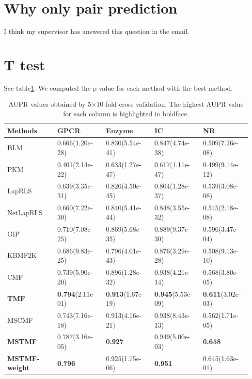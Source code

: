 \documentclass{article}
\begin{document}
\section{Why only pair prediction}
I think my supervisor has answered this question in the email. 

\section{T test}
See table\ref{results_comp_with_other_methods}.
We computed the p value for each method with the best method.

\begin{table}[htbp]
\caption{AUPR values obtained by 5$\times$10-fold cross validation. The highest AUPR value for each column is highlighted in boldface. }\label{results_comp_with_other_methods}
\centering
{}
\begin{tabular}{lllll}
\toprule
Methods & GPCR & Enzyme & IC & NR\\
\midrule
BLM & 0.666(1.20e-28) & 0.830(5.54e-41) & 0.847(4.74e-38) & 0.509(7.26e-08) \\
PKM & 0.401(2.14e-22) & 0.633(1.27e-47)  & 0.617(1.11e-47) & 0.499(9.14e-12) \\
LapRLS & 0.639(3.35e-31) & 0.826(4.50e-45) & 0.804(1.28e-37) & 0.539(3.08e-08)\\
NetLapRLS & 0.660(7.22e-30) & 0.840(5.41e-44) & 0.848(3.55e-32) & 0.545(2.18e-08)\\
GIP	 & 0.710(7.08e-25) & 0.869(5.68e-35) & 0.889(9.37e-30) & 0.596(3.47e-04)\\
KBMF2K & 0.686(9.83e-25) & 0.796(4.01e-43) & 0.876(3.29e-28) & 0.508(9.13e-10) \\
CMF & 0.739(5.90e-20) & 0.896(1.28e-32) & 0.938(4.21e-14) & 0.568(3.80e-05)\\
\textbf{TMF} & \textbf{0.794}(2.11e-01) & \textbf{0.913}(1.67e-19) & \textbf{0.945}(5.53e-09) & \textbf{0.611}(3.02e-03) \\ 
\midrule
MSCMF & 0.743(7.16e-18) & 0.913(4.16e-21) & 0.938(8.43e-13) & 0.562(1.71e-05) \\
\textbf{MSTMF} & 0.787(3.16e-05) & \textbf{0.927} & 0.949(5.00e-03) & \textbf{0.658} \\
\textbf{MSTMF-weight} & \textbf{0.796} & 0.925(1.75e-06) & \textbf{0.951} & 0.645(1.63e-01)\\
\bottomrule
\end{tabular} \\
\end{table}
\end{document}
